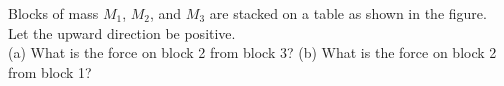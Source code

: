 Blocks of mass $M_1$, $M_2$, and $M_3$ are stacked on a table as shown in the figure. Let the
upward direction be positive.\\
%
(a) What is the force on block 2 from block 3?\answercheck\hwendpart
%
(b) What is the force on block 2 from block 1?\answercheck
